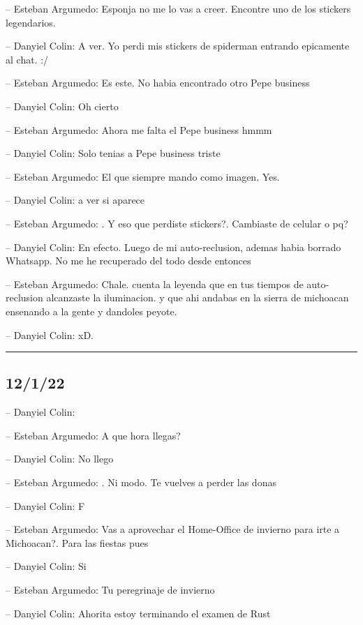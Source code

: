 -- Esteban Argumedo: Esponja no me lo vas a creer. Encontre uno de los
stickers legendarios.

-- Danyiel Colin: A ver. Yo perdi mis stickers de spiderman entrando
epicamente al chat. :/

-- Esteban Argumedo: Es este. No habia encontrado otro Pepe business

-- Danyiel Colin: Oh cierto

-- Esteban Argumedo: Ahora me falta el Pepe business hmmm

-- Danyiel Colin: Solo tenias a Pepe business triste

-- Esteban Argumedo: El que siempre mando como imagen. Yes.

-- Danyiel Colin: a ver si aparece

-- Esteban Argumedo: . Y eso que perdiste stickers?. Cambiaste de
celular o pq?

-- Danyiel Colin: En efecto. Luego de mi auto-reclusion, ademas habia
borrado Whatsapp. No me he recuperado del todo desde entonces

-- Esteban Argumedo: Chale. cuenta la leyenda que en tus tiempos de
auto-reclusion alcanzaste la iluminacion. y que ahi andabas en la sierra
de michoacan ensenando a la gente y dandoles peyote.

-- Danyiel Colin: xD.

\begin{center}\rule{0.5\linewidth}{0.5pt}\end{center}

\hypertarget{section-167}{%
\subsection{12/1/22}\label{section-167}}

-- Danyiel Colin:

-- Esteban Argumedo: A que hora llegas?

-- Danyiel Colin: No llego

-- Esteban Argumedo: . Ni modo. Te vuelves a perder las donas

-- Danyiel Colin: F

-- Esteban Argumedo: Vas a aprovechar el Home-Office de invierno para
irte a Michoacan?. Para las fiestas pues

-- Danyiel Colin: Si

-- Esteban Argumedo: Tu peregrinaje de invierno

-- Danyiel Colin: Ahorita estoy terminando el examen de Rust

